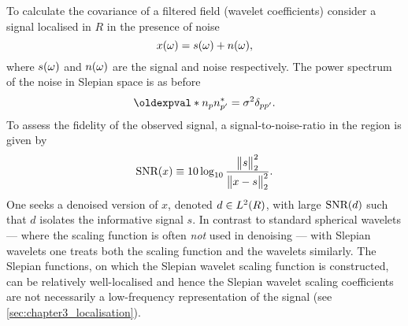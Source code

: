 To calculate the covariance of a filtered field (wavelet coefficients) consider a signal localised in \(R\) in the presence of noise
%
\begin{equation}\label{eq:chapter3_noised_signal}
	x(\omega) = s(\omega) + n(\omega),
\end{equation}
%
where \(s(\omega)\) and \(n(\omega)\) are the signal and noise respectively.
The power spectrum of the noise in Slepian space is as before
%
\begin{equation}
	\expval{\slepian{n} \conj{\slepian[']{n}}}
	= \sigma^{2} \delta_{pp'}.
\end{equation}
%
To assess the fidelity of the observed signal, a signal-to-noise-ratio in the region is given by
%
\begin{equation}
	\text{SNR}(x)
	\equiv 10 \log_{10} \frac{{\big\lVert s\big\rVert}_{2}^{2}}{{\big\lVert x - s\big\rVert}_{2}^{2}}.
\end{equation}
%
One seeks a denoised version of \(x\), denoted \(d \in L^{2}(R)\), with large \(\text{SNR}(d)\) such that \(d\) isolates the informative signal \(s\).
In contrast to standard spherical wavelets --- where the scaling function is often \emph{not} used in denoising --- with Slepian wavelets one treats both the scaling function and the wavelets similarly.
The Slepian functions, on which the Slepian wavelet scaling function is constructed, can be relatively well-localised and hence the Slepian wavelet scaling coefficients are not necessarily a low-frequency representation of the signal (see \cref{sec:chapter3_localisation}).

